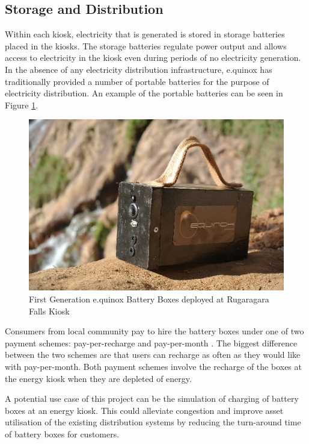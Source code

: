 \subsection*{Storage and Distribution}
Within each kiosk, electricity that is generated is stored in storage batteries placed in the kiosks. The storage batteries regulate power output and allows access to electricity in the kiosk even during periods of no electricity generation.
In the absence of any electricity distribution infrastructure, e.quinox has traditionally provided a number of portable batteries for the purpose of electricity distribution. An example of the portable batteries can be seen in Figure \ref{fig:AmaziBox}.

\begin{figure}[h!]
\centering
\includegraphics[scale=0.7]{Images/AmaziBox.jpg}
\caption{First Generation e.quinox Battery Boxes deployed at Rugaragara Falls Kiosk}
\label{fig:AmaziBox}
\end{figure}

Consumers from local community pay to hire the battery boxes under one of two payment schemes: pay-per-recharge and pay-per-month \cite{e.quinox-Hydro-web:2012}. The biggest difference between the two schemes are that users can recharge as often as they would like with pay-per-month. Both payment schemes involve the recharge of the boxes at the energy kiosk when they are depleted of energy.

A potential use case of this project can be the simulation of charging of battery boxes at an energy kiosk. This could alleviate congestion and improve asset utilisation of the existing distribution systems by reducing the turn-around time of battery boxes for customers.

